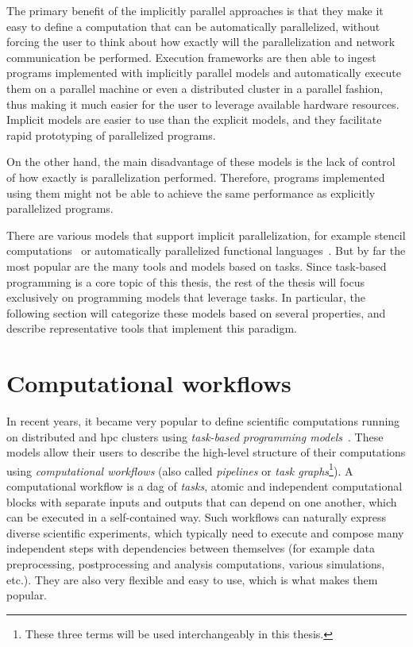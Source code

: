 The primary benefit of the implicitly parallel approaches is that they make it easy to define a
computation that can be automatically parallelized, without forcing the user to think about how
exactly will the parallelization and network communication be performed. Execution frameworks are
then able to ingest programs implemented with implicitly parallel models and automatically execute
them on a parallel machine or even a distributed cluster in a parallel fashion, thus making it much
easier for the user to leverage available hardware resources. Implicit models are easier to use
than the explicit models, and they facilitate rapid prototyping of parallelized programs.

On the other hand, the main disadvantage of these models is the lack of control of how exactly is
parallelization performed. Therefore, programs implemented using them might not be able to achieve
the same performance as explicitly parallelized programs.

There are various models that support implicit parallelization, for example stencil
computations~\cite{stencil} or automatically parallelized functional
languages~\cite{parallel_haskell}. But by far the most popular are the many tools and models based
on tasks. Since task-based programming is a core topic of this thesis, the rest of the thesis will
focus exclusively on programming models that leverage tasks. In particular, the following section
will categorize these models based on several properties, and describe representative tools that
implement this paradigm.

\section{Computational workflows}
In recent years, it became very popular to define scientific computations running on distributed
and \gls{hpc} clusters using \emph{task-based programming models}~\cite{pegasus,workflows1,workflows_at_scale}. These
models allow their users to describe the high-level structure of their computations using
\emph{computational workflows} (also called \emph{pipelines} or \emph{task graphs}\footnote{These three terms will be used interchangeably in this thesis.}). A computational workflow is a \gls{dag} of
\emph{tasks}, atomic and independent computational blocks with separate inputs and
outputs that can depend on one another, which can be executed in a self-contained way. Such
workflows can naturally express diverse scientific experiments, which typically need to execute and
compose many independent steps with dependencies between themselves (for example data
preprocessing, postprocessing and analysis computations, various simulations, etc.). They are also
very flexible and easy to use, which is what makes them popular.


